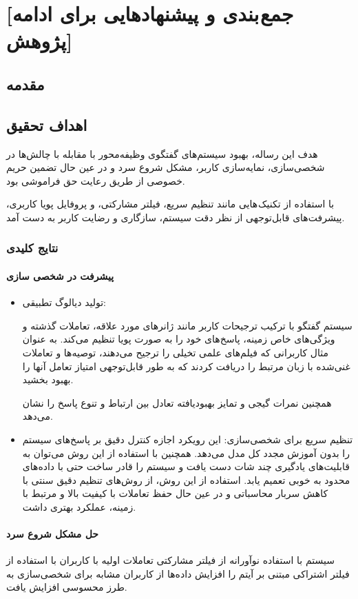 \chapter{[جمع بندی و پیشنهادهایی برای ادامه پژوهش]}
\section{مقدمه}

\section{اهداف تحقیق}
هدف این رساله، بهبود سیستم‌های گفتگوی وظیفه‌محور با مقابله با چالش‌ها در شخصی‌سازی، نمایه‌سازی کاربر، مشکل شروع سرد و در عین حال تضمین حریم خصوصی از طریق رعایت حق فراموشی بود. 

با استفاده از تکنیک هایی مانند تنظیم سریع، فیلتر مشارکتی، و پروفایل پویا کاربری، پیشرفت‌های قابل‌توجهی از نظر دقت سیستم، سازگاری و رضایت کاربر به دست آمد.

\subsection{نتایج کلیدی}

\subsubsection{پیشرفت در شخصی سازی}
\begin{itemize}
\item
تولید دیالوگ تطبیقی:
 
سیستم گفتگو با ترکیب ترجیحات کاربر مانند ژانرهای مورد علاقه، تعاملات گذشته و ویژگی‌های خاص زمینه، پاسخ‌های خود را به صورت پویا تنظیم می‌کند. به عنوان مثال کاربرانی که فیلم‌های علمی تخیلی را ترجیح می‌دهند، توصیه‌ها و تعاملات غنی‌شده با زبان مرتبط را دریافت کردند که به طور قابل‌توجهی امتیاز تعامل آنها را بهبود بخشید.

همچنین نمرات گیجی و تمایز بهبود‌یافته تعادل بین ارتباط و تنوع پاسخ را نشان می‌دهد.
\item
 تنظیم سریع برای شخصی‌سازی:
 این رویکرد اجازه کنترل دقیق بر پاسخ‌های سیستم را بدون آموزش مجدد کل مدل می‌دهد. همچنین با استفاده از این روش می‌توان به قابلیت‌های یادگیری چند شات دست یافت و سیستم را قادر ساخت حتی با داده‌های محدود به خوبی تعمیم یابد.
استفاده از این روش، از روش‌های تنظیم دقیق سنتی با کاهش سربار محاسباتی و در عین حال حفظ تعاملات با کیفیت بالا و مرتبط با زمینه، عملکرد بهتری داشت.
\end{itemize}
\subsubsection{حل مشکل شروع سرد}
سیستم با استفاده نوآورانه از فیلتر مشارکتی تعاملات اولیه با کاربران با استفاده از فیلتر اشتراکی مبتنی بر آیتم را افزایش داده‌ها از کاربران مشابه برای شخصی‌سازی به طرز محسوسی افزایش یافت.

